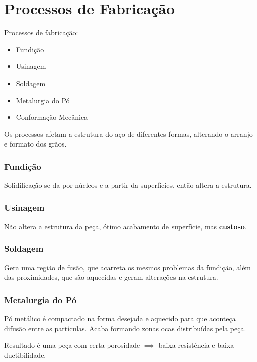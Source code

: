 
\section*{Processos de Fabricação}

Processos de fabricação:
\begin{itemize}
    \item Fundição
    \item Usinagem
    \item Soldagem
    \item Metalurgia do Pó
    \item Conformação Mecânica
\end{itemize}

Os processos afetam a estrutura do aço de diferentes formas, alterando o arranjo e formato dos grãos.

\subsubsection*{Fundição}

Solidificação se da por núcleos e a partir da superfícies, então altera a estrutura.

\subsubsection*{Usinagem}

Não altera a estrutura da peça, ótimo acabamento de superfície, mas \textbf{custoso}.

\subsubsection*{Soldagem}

Gera uma região de fusão, que acarreta os mesmos problemas da fundição, além das proximidades, que são aquecidas e geram alterações na estrutura.

\subsubsection*{Metalurgia do Pó}

Pó metálico é compactado na forma desejada e aquecido para que aconteça difusão entre as partículas. Acaba formando zonas ocas distribuídas pela peça.

Resultado é uma peça com certa porosidade $\implies$ baixa resistência e baixa ductibilidade.


